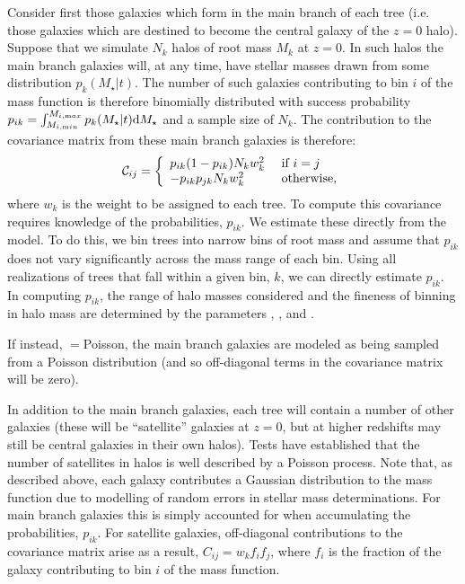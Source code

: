Consider first those galaxies which form in the main branch of each tree (i.e. those galaxies which are destined to become the central galaxy of the $z=0$ halo). Suppose that we simulate $N_k$ halos of root mass $M_k$ at $z=0$. In such halos the main branch galaxies will, at any time, have stellar masses drawn from some distribution $p_k(M_\star|t)$. The number of such galaxies contributing to bin $i$ of the mass function is therefore binomially distributed with success probability $p_{ik} = \int_{M_{i,\mathrm min}}^{M_{i,\mathrm max}} p_k(M_\star|t) \d M_\star$ and a sample size of $N_k$. The contribution to the covariance matrix from these main branch galaxies is therefore:
\begin{equation}
 \mathcal{C}_{ij} = \left\{ \begin{array}{ll} p_{ik}(1-p_{ik}) N_k w_k^2 & \hbox{ if } i = j \\ -p_{ik} p_{jk} N_k w_k^2 & \hbox{ otherwise,} \end{array} \right.
\end{equation}
where $w_k$ is the weight to be assigned to each tree. To compute this covariance requires knowledge of the probabilities, $p_{ik}$. We estimate these directly from the model. To do this, we bin trees into narrow bins of root mass and assume that $p_{ik}$ does not vary significantly across the mass range of each bin. Using all realizations of trees that fall within a given bin, $k$, we can directly estimate $p_{ik}$. In computing $p_{ik}$, the range of halo masses considered and the fineness of binning in halo mass are determined by the parameters {\normalfont \ttfamily [analysisMassFunctionsHaloMassMinimum]}, {\normalfont \ttfamily [analysisMassFunctionsHaloMassMaximum]}, and {\normalfont \ttfamily [analysisMassFunctionsHaloMassBinsPerDecade]}.

If instead, {\normalfont \ttfamily [analysisMassFunctionCovarianceModel]}$=${\normalfont \ttfamily Poisson}, the main branch galaxies are modeled as being sampled from a Poisson distribution (and so off-diagonal terms in the covariance matrix will be zero). 

In addition to the main branch galaxies, each tree will contain a number of other galaxies (these will be ``satellite'' galaxies at $z=0$, but at higher redshifts may still be central galaxies in their own halos). Tests have established that the number of satellites in halos is well described by a Poisson process. Note that, as described above, each galaxy contributes a Gaussian distribution to the mass function due to modelling of random errors in stellar mass determinations. For main branch galaxies this is simply accounted for when accumulating the probabilities, $p_{ik}$. For satellite galaxies, off-diagonal contributions to the covariance matrix arise as a result, $C_{ij} = w_k f_i f_j$, where $f_i$ is the fraction of the galaxy contributing to bin $i$ of the mass function.

